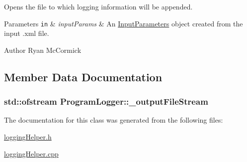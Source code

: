 Opens the file to which logging information will be appended. 


\begin{DoxyParams}[1]{Parameters}
\mbox{\tt in}  & {\em input\-Params} & An \hyperlink{classInputParameters}{Input\-Parameters} object created from the input .xml file. \\
\hline
\end{DoxyParams}
\begin{DoxyAuthor}{Author}
Ryan Mc\-Cormick 
\end{DoxyAuthor}


\subsection{Member Data Documentation}
\hypertarget{classProgramLogger_a8f50db08351b68577720255843dfd629}{
\subsubsection[{\-\_\-output\-File\-Stream}]{\setlength{\rightskip}{0pt plus 5cm}std\-::ofstream Program\-Logger\-::\-\_\-output\-File\-Stream}}\label{classProgramLogger_a8f50db08351b68577720255843dfd629}


The documentation for this class was generated from the following files\-:\begin{DoxyCompactItemize}
\item 
\hyperlink{loggingHelper_8h}{logging\-Helper.\-h}\item 
\hyperlink{loggingHelper_8cpp}{logging\-Helper.\-cpp}\end{DoxyCompactItemize}
